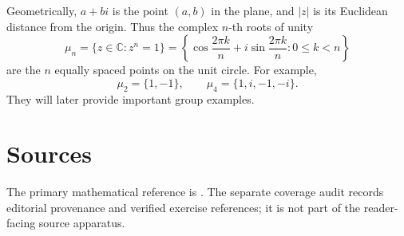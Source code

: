 Geometrically, \(a+bi\) is the point \((a,b)\) in the plane, and \(|z|\) is
its Euclidean distance from the origin. Thus the complex \(n\)-th roots of
unity
\[
\mu_n=\{z\in\mathbb C:z^n=1\}
=\left\{\cos\frac{2\pi k}{n}+i\sin\frac{2\pi k}{n}:0\leq k<n\right\}
\]
are the \(n\) equally spaced points on the unit circle. For example,
\[
\mu_2=\{1,-1\},\qquad \mu_4=\{1,i,-1,-i\}.
\]
They will later provide important group examples.

\section{Sources}

The primary mathematical reference is \cite{DF}.  The separate coverage audit
records editorial provenance and verified exercise references; it is not part
of the reader-facing source apparatus.
